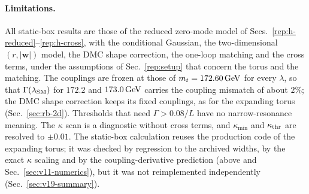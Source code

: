 \paragraph{Limitations.}
All static-box results are those of the reduced zero-mode model of Secs.~\ref{rep:h-reduced}--\ref{rep:h-cross}, with the conditional Gaussian, the two-dimensional $(r,|\bm w|)$ model, the DMC shape correction, the one-loop matching and the cross terms, under the assumptions of Sec.~\ref{rep:setup} that concern the torus and the matching.
The couplings are frozen at those of $m_t=172.60\,\mathrm{GeV}$ for every $\lambda$, so that $\Gamma(\lambda_{\rm SM})$ for $172.2$ and $173.0\,\mathrm{GeV}$ carries the coupling mismatch of about $2\%$; the DMC shape correction keeps its fixed couplings, as for the expanding torus (Sec.~\ref{sec:rb-2d}). %
Thresholds that need $\Gamma>0.08/L$ have no narrow-resonance meaning.
The $\kappa$ scan is a diagnostic without cross terms, and $\kappa_{\min}$ and $\kappa_{\rm thr}$ are resolved to $\pm0.01$.
The static-box calculation reuses the production code of the expanding torus; it was checked by regression to the archived widths, by the exact $\kappa$ scaling and by the coupling-derivative prediction (above and Sec.~\ref{sec:v11-numerics}), but it was not reimplemented independently (Sec.~\ref{sec:v19-summary}).

